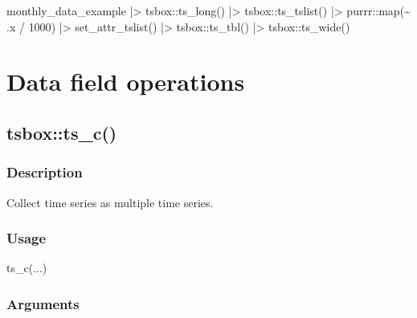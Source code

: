 \documentclass[
  letterpaper,
  DIV=11,
  numbers=noendperiod]{scrreport}
\newenvironment{Shaded}{\begin{snugshade}}{\end{snugshade}}
\newcommand{\DecValTok}[1]{\textcolor[rgb]{0.68,0.00,0.00}{#1}}
\newcommand{\FunctionTok}[1]{\textcolor[rgb]{0.28,0.35,0.67}{#1}}
\newcommand{\NormalTok}[1]{\textcolor[rgb]{0.00,0.23,0.31}{#1}}
\newcommand{\SpecialCharTok}[1]{\textcolor[rgb]{0.37,0.37,0.37}{#1}}
\begin{document}
\begin{Shaded}
\begin{Highlighting}[]
\NormalTok{monthly\_data\_example }\SpecialCharTok{|\textgreater{}}
\NormalTok{  tsbox}\SpecialCharTok{::}\FunctionTok{ts\_long}\NormalTok{() }\SpecialCharTok{|\textgreater{}}
\NormalTok{  tsbox}\SpecialCharTok{::}\FunctionTok{ts\_tslist}\NormalTok{() }\SpecialCharTok{|\textgreater{}}
\NormalTok{  purrr}\SpecialCharTok{::}\FunctionTok{map}\NormalTok{(}\SpecialCharTok{\textasciitilde{}}\NormalTok{ .x }\SpecialCharTok{/} \DecValTok{1000}\NormalTok{) }\SpecialCharTok{|\textgreater{}}
  \FunctionTok{set\_attr\_tslist}\NormalTok{() }\SpecialCharTok{|\textgreater{}}
\NormalTok{  tsbox}\SpecialCharTok{::}\FunctionTok{ts\_tbl}\NormalTok{() }\SpecialCharTok{|\textgreater{}}
\NormalTok{  tsbox}\SpecialCharTok{::}\FunctionTok{ts\_wide}\NormalTok{()}
\end{Highlighting}
\end{Shaded}

\section{Data field operations}\label{sec-field}

\subsection{tsbox::ts\_c()}\label{tsboxts_c}

\subsubsection{Description}\label{description-55}

Collect time series as multiple time series.

\subsubsection{Usage}\label{usage-55}

\begin{Shaded}
\begin{Highlighting}[]
\FunctionTok{ts\_c}\NormalTok{(...)}
\end{Highlighting}
\end{Shaded}

\subsubsection{Arguments}\label{arguments-55}
\end{document}
